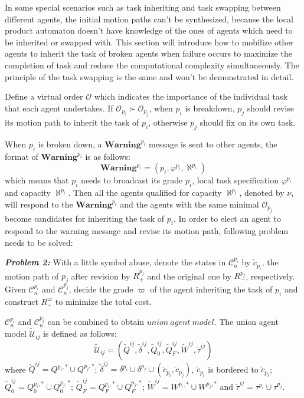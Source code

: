 \documentclass[journal]{IEEEtran}
\begin{document}
In some special scenarios such as task inheriting and task swapping between different agents, the initial motion paths can't be synthesized, because the local product automaton doesn't have knowledge of the ones of agents which need to be inherited or swapped with. This section will introduce how to mobilize other agents to inherit the task of broken agents when failure occurs to maximize the completion of task and reduce the computational complexity simultaneously. The principle of the task swapping is the same and won't be demonstrated in detail.

Define a virtual order $\mathcal{O}$ which indicates the importance of the individual task that each agent undertakes. If $\mathcal{O}_{p_i}\succ \mathcal{O}_{p_j}$, when $p_i$ is breakdown, $p_j$ should revise its motion path to inherit the task of $p_i$, otherwise $p_j$ should fix on its own task.\par
When $p_i$ is broken down, a $\textbf{Warning}^{p_i}$ message is sent to other agents, the format of $\textbf{Warning}^{p_i}$ is as follows:
$$\textbf{Warning}^{p_i} = (p_i,\varphi^{p_i},\aleph^{p_i})$$
which means that $p_i$ needs to broadcast its grade $p_i$, local task specification $\varphi^{p_i}$ and capacity $\aleph^{p_i}$. Then all the agents qualified for capacity $\aleph^{p_i}$, denoted by $\nu$, will respond to the $\textbf{Warning}^{p_i}$ and the agents with the same minimal $\mathcal{O}_{p_j}$ become candidates for inheriting the task of $p_i$. In order to elect an agent to respond to the warning message and revise its motion path, following problem needs to be solved:\par
\textbf{\emph{Problem 2:}} With a little symbol abuse, denote the states in $\mathcal{C}^{p_i}_n$ by $\tilde{c}_{p_i}$, the motion path of $p_j$ after revision by $R^{p_j}_+$ and the original one by $R^{p_j}_-$, respectively. Given $\mathcal{C}^{p_i}_n$ and $\mathcal{C}^{p_j}_n$, decide the grade $\varpi$ of the agent inheriting the task of $p_i$ and construct $R^{\varpi}_+$ to minimize the total cost. \par
$\mathcal{C}^{p_i}_n$ and $\mathcal{C}^{p_j}_n$ can be combined to obtain $union\ agent\ model$. The union agent model $\widetilde{\mathcal{U}}_{ij}$ is defined as follows:
$$\widetilde{\mathcal{U}}_{ij}=(\widetilde{Q}^{ij},\tilde{\delta}^{ij},\widetilde{Q}^{ij}_0,\widetilde{Q}^{ij}_F,\widetilde{W}^{ij},\tilde{\tau}^{ij})$$
where $\widetilde{Q}^{ij}=Q^{p_i,\ast}\cup Q^{p_j,\ast}$; $\tilde{\delta}^{ij}=\delta^{p_i}\cup \delta^{p_j} \cup (\tilde{c}_{p_i},\tilde{c}_{p_j})$, $\tilde{c}_{p_i}$ is bordered to $\tilde{c}_{p_i}$; $\widetilde{Q}^{ij}_0=Q^{p_i,\ast}_0\cup Q^{p_j,\ast}_0$; $\widetilde{Q}^{ij}_F=Q^{p_i,\ast}_F\cup Q^{p_j,\ast}_F$; $\widetilde{W}^{ij}=W^{p_i,\ast}\cup W^{p_j,\ast}$ and $\tilde{\tau}^{ij}=\tau^{p_i}\cup \tau^{p_j}$.\par
\end{document}
